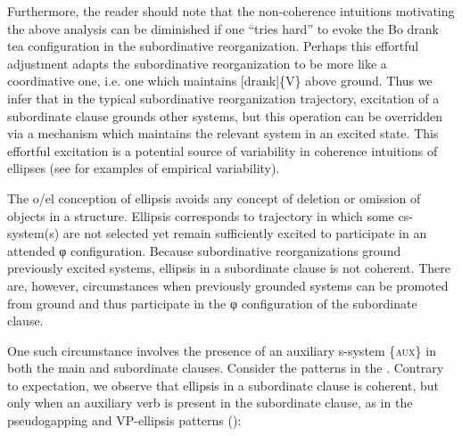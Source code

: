  Furthermore, the reader should note that the non-coherence intuitions motivating the above analysis can be diminished if one “tries hard” to evoke the {\textbar}Bo drank tea{\textbar} configuration in the subordinative reorganization. Perhaps this effortful adjustment adapts the subordinative reorganization to be more like a coordinative one, i.e. one which maintains [drank]\{V\} above ground. Thus we infer that in the typical subordinative reorganization trajectory, excitation of a subordinate clause grounds other systems, but this operation can be overridden via a mechanism which maintains the relevant system in an excited state. This effortful excitation is a potential source of variability in coherence intuitions of ellipses (see \citealt{FrazierClifton2005,Phillips2003,PhillipsParker2014} for examples of empirical variability). 

  The o/el conception of ellipsis avoids any concept of deletion or omission of objects in a structure. Ellipsis corresponds to trajectory in which some cs-system(s) are not selected yet remain sufficiently excited to participate in an attended φ configuration. Because subordinative reorganizations ground previously excited systems, ellipsis in a subordinate clause is not coherent. There are, however, circumstances when previously grounded systems can be promoted from ground and thus participate in the φ configuration of the subordinate clause. 

  One such circumstance involves the presence of an auxiliary s-system \{\textsc{aux}\} in both the main and subordinate clauses. Consider the patterns in the {\tablebelow}. Contrary to expectation, we observe that ellipsis in a subordinate clause is coherent, but only when an auxiliary verb is present in the subordinate clause, as in the pseudogapping and VP-ellipsis patterns (\citealt{Johnson20012009,Merchant2001}):

